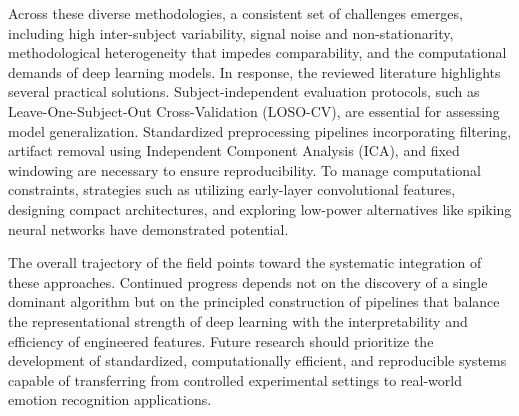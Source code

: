 \documentclass[conference]{IEEEtran}
\begin{document}
Across these diverse methodologies, a consistent set of challenges emerges, including high inter-subject variability, signal noise and non-stationarity, methodological heterogeneity that impedes comparability, and the computational demands of deep learning models. In response, the reviewed literature highlights several practical solutions. Subject-independent evaluation protocols, such as Leave-One-Subject-Out Cross-Validation (LOSO-CV), are essential for assessing model generalization. Standardized preprocessing pipelines incorporating filtering, artifact removal using Independent Component Analysis (ICA), and fixed windowing are necessary to ensure reproducibility. To manage computational constraints, strategies such as utilizing early-layer convolutional features, designing compact architectures, and exploring low-power alternatives like spiking neural networks have demonstrated potential.

The overall trajectory of the field points toward the systematic integration of these approaches. Continued progress depends not on the discovery of a single dominant algorithm but on the principled construction of pipelines that balance the representational strength of deep learning with the interpretability and efficiency of engineered features. Future research should prioritize the development of standardized, computationally efficient, and reproducible systems capable of transferring from controlled experimental settings to real-world emotion recognition applications.




\end{document}
